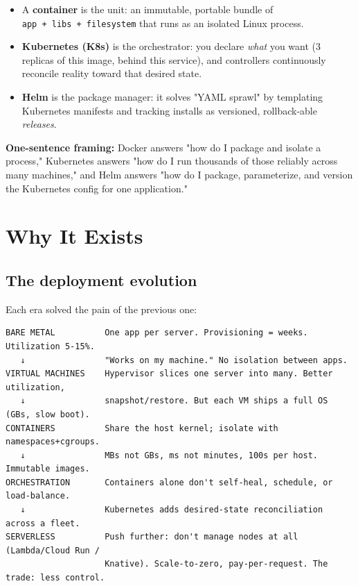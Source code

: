 \documentclass[11pt]{article}
\providecommand{\tightlist}{\setlength{\itemsep}{1pt}\setlength{\parskip}{0pt}}
\begin{document}
\begin{itemize}
\tightlist
\item
  A \textbf{container} is the unit: an immutable, portable bundle of \texttt{app\ +\ libs\ +\ filesystem} that runs as an isolated Linux process.
\item
  \textbf{Kubernetes (K8s)} is the orchestrator: you declare \emph{what} you want (3 replicas of this image, behind this service), and controllers continuously reconcile reality toward that desired state.
\item
  \textbf{Helm} is the package manager: it solves "YAML sprawl" by templating Kubernetes manifests and tracking installs as versioned, rollback-able \emph{releases}.
\end{itemize}

\textbf{One-sentence framing:} Docker answers "how do I package and isolate a process," Kubernetes answers "how do I run thousands of those reliably across many machines," and Helm answers "how do I package, parameterize, and version the Kubernetes config for one application."

\section{Why It Exists}\label{why-it-exists}

\subsection{The deployment evolution}\label{the-deployment-evolution}

Each era solved the pain of the previous one:

\setcodelang{}

\begin{verbatim}
BARE METAL          One app per server. Provisioning = weeks. Utilization 5-15%.
   ↓                "Works on my machine." No isolation between apps.
VIRTUAL MACHINES    Hypervisor slices one server into many. Better utilization,
   ↓                snapshot/restore. But each VM ships a full OS (GBs, slow boot).
CONTAINERS          Share the host kernel; isolate with namespaces+cgroups.
   ↓                MBs not GBs, ms not minutes, 100s per host. Immutable images.
ORCHESTRATION       Containers alone don't self-heal, schedule, or load-balance.
   ↓                Kubernetes adds desired-state reconciliation across a fleet.
SERVERLESS          Push further: don't manage nodes at all (Lambda/Cloud Run /
                    Knative). Scale-to-zero, pay-per-request. The trade: less control.
\end{verbatim}
\end{document}
